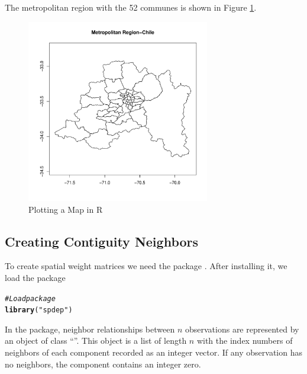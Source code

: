 \documentclass[english,12pt]{book}\usepackage[]{graphicx}\usepackage[]{xcolor}
\makeatletter
\newcommand{\hlstr}[1]{\textcolor[rgb]{0.192,0.494,0.8}{#1}}%
\newcommand{\hlcom}[1]{\textcolor[rgb]{0.678,0.584,0.686}{\textit{#1}}}%
\newcommand{\hlstd}[1]{\textcolor[rgb]{0.345,0.345,0.345}{#1}}%
\newcommand{\hlkwd}[1]{\textcolor[rgb]{0.737,0.353,0.396}{\textbf{#1}}}%
\newenvironment{kframe}{%
 \def\at@end@of@kframe{}%
 \ifinner\ifhmode%
  \def\at@end@of@kframe{\end{minipage}}%
  \begin{minipage}{\columnwidth}%
 \fi\fi%
 \def\FrameCommand##1{\hskip\@totalleftmargin \hskip-\fboxsep
 \colorbox{shadecolor}{##1}\hskip-\fboxsep
     \hskip-\linewidth \hskip-\@totalleftmargin \hskip\columnwidth}%
 \MakeFramed {\advance\hsize-\width
   \@totalleftmargin\z@ \linewidth\hsize
   \@setminipage}}%
 {\par\unskip\endMakeFramed%
 \at@end@of@kframe}
\newenvironment{knitrout}{}{} %
\makeatother
\begin{document}
The metropolitan region with the 52 communes is shown in Figure \ref{fig:plot_mr}.

\begin{figure}[h]
  \caption{Plotting a Map in R}
    \label{fig:plot_mr}
\begin{knitrout}
\color{fgcolor}

{\centering \includegraphics[width=8cm,height=8cm]{figure/plot_mr-1} 

}


\end{knitrout}
\end{figure}

\subsection{Creating Contiguity Neighbors}

To create spatial weight matrices we need the  package \citep{bivand2013computing}. After installing it, we load the package

\begin{knitrout}
\color{fgcolor}\begin{kframe}
\begin{alltt}
\hlcom{#Load package}
\hlkwd{library}\hlstd{(}\hlstr{"spdep"}\hlstd{)}
\end{alltt}
\end{kframe}
\end{knitrout}

In the  package, neighbor relationships between $n$ observations are represented by an object of class ``''. This object is a list of length $n$ with the index numbers of neighbors of each component recorded as an integer vector. If any observation has no neighbors, the component contains an integer zero. 
\end{document}
